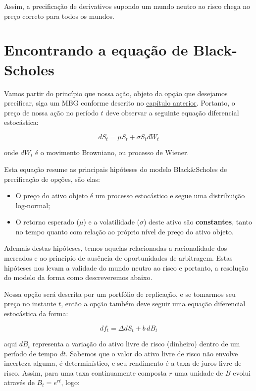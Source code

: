 \documentclass[]{book}
\providecommand{\tightlist}{%
  \setlength{\itemsep}{0pt}\setlength{\parskip}{0pt}}
\begin{document}
Assim, a precificação de derivativos supondo um mundo neutro ao risco
chega no preço correto para todos os mundos.

\section{Encontrando a equação de
Black-Scholes}\label{encontrando-a-equacao-de-black-scholes}

Vamos partir do princípio que nossa ação, objeto da opção que desejamos
precificar, siga um MBG conforme descrito no
\protect\hyperlink{processos-estocasticos}{capítulo anterior}. Portanto,
o preço de nossa ação no período \(t\) deve observar a seguinte equação
diferencial estocástica:

\begin{equation}
dS_t=\mu S_t+\sigma S_t dW_t 
\label{eq:ds}
\end{equation}

onde \(dW_t\) é o movimento Browniano, ou processo de Wiener.

Esta equação resume as principais hipóteses do modelo Black\&Scholes de
precificação de opções, são elas:

\begin{itemize}
\tightlist
\item
  O preço do ativo objeto é um processo estocástico e segue uma
  distribuição log-normal;
\item
  O retorno esperado (\(\mu\)) e a volatilidade (\(\sigma\)) deste ativo
  são \textbf{constantes}, tanto no tempo quanto com relação ao próprio
  nível de preço do ativo objeto.
\end{itemize}

Ademais destas hipóteses, temos aquelas relacionadas a racionalidade dos
mercados e ao princípio de ausência de oportunidades de arbitragem.
Estas hipóteses nos levam a validade do mundo neutro ao risco e
portanto, a resolução do modelo da forma como descreveremos abaixo.

Nossa opção será descrita por um portfólio de replicação, e se tomarmos
seu preço no instante \(t\), então a opção também deve seguir uma
equação diferencial estocástica da forma:

\begin{equation}
df_t=\Delta dS_t+b\,dB_t 
\label{eq:df1}
\end{equation}

aqui \(dB_t\) representa a variação do ativo livre de risco (dinheiro)
dentro de um período de tempo \(dt\). Sabemos que o valor do ativo livre
de risco não envolve incerteza alguma, é determinístico, e seu
rendimento é a taxa de juros livre de risco. Assim, para uma taxa
continuamente composta \(r\) uma unidade de \(B\) evolui através de
\(B_t=e^{rt}\), logo:
\end{document}

